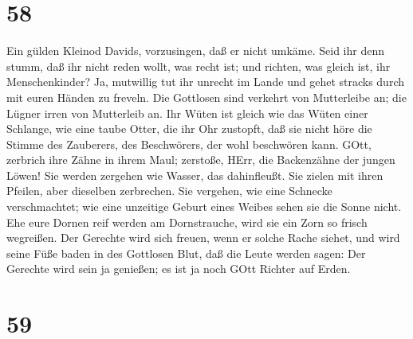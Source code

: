 \hypertarget{section-57}{%
\section{58}\label{section-57}}

 Ein gülden Kleinod Davids, vorzusingen, daß er nicht
umkäme.  Seid ihr denn stumm, daß ihr nicht reden wollt, was
recht ist; und richten, was gleich ist, ihr Menschenkinder? 
Ja, mutwillig tut ihr unrecht im Lande und gehet stracks durch mit euren
Händen zu freveln.  Die Gottlosen sind verkehrt von
Mutterleibe an; die Lügner irren von Mutterleib an.  Ihr
Wüten ist gleich wie das Wüten einer Schlange, wie eine taube Otter, die
ihr Ohr zustopft,  daß sie nicht höre die Stimme des
Zauberers, des Beschwörers, der wohl beschwören kann.  GOtt,
zerbrich ihre Zähne in ihrem Maul; zerstoße, HErr, die Backenzähne der
jungen Löwen!  Sie werden zergehen wie Wasser, das
dahinfleußt. Sie zielen mit ihren Pfeilen, aber dieselben zerbrechen.
 Sie vergehen, wie eine Schnecke verschmachtet; wie eine
unzeitige Geburt eines Weibes sehen sie die Sonne nicht. 
Ehe eure Dornen reif werden am Dornstrauche, wird sie ein Zorn so frisch
wegreißen.  Der Gerechte wird sich freuen, wenn er solche
Rache siehet, und wird seine Füße baden in des Gottlosen Blut,
 daß die Leute werden sagen: Der Gerechte wird sein ja
genießen; es ist ja noch GOtt Richter auf Erden.

\hypertarget{section-58}{%
\section{59}\label{section-58}}


